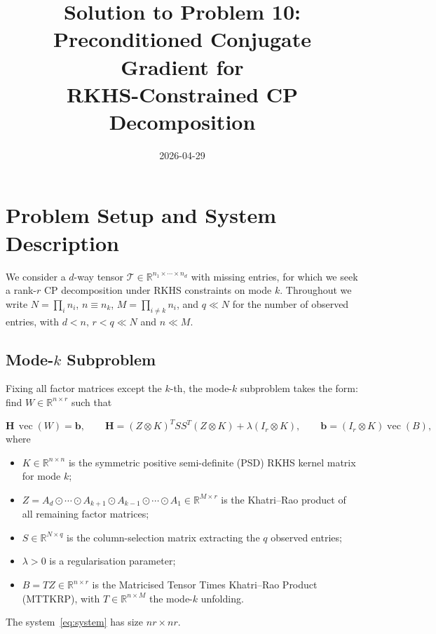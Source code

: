 \documentclass[12pt]{article}
\title{Solution to Problem 10:\\
Preconditioned Conjugate Gradient for\\
RKHS-Constrained CP Decomposition}
\author{}
\date{2026-04-29}
\theoremstyle{definition}
\DeclareMathOperator{\vecop}{vec}
\newcommand{\R}{\mathbb{R}}
\newcommand{\bH}{\mathbf{H}}
\begin{document}
\maketitle

\section{Problem Setup and System Description}

We consider a $d$-way tensor $\mathcal{T}\in\R^{n_1\times\cdots\times n_d}$ with
missing entries, for which we seek a rank-$r$ CP decomposition under RKHS
constraints on mode $k$.  Throughout we write $N=\prod_i n_i$, $n\equiv n_k$,
$M=\prod_{i\neq k}n_i$, and $q\ll N$ for the number of observed entries, with
$d < n,\,r < q\ll N$ and $n\ll M$.

\subsection{Mode-$k$ Subproblem}

Fixing all factor matrices except the $k$-th, the mode-$k$ subproblem takes the
form: find $W\in\R^{n\times r}$ such that

\begin{equation}\label{eq:system}
  \bH\,\vecop(W) = \mathbf{b},
  \qquad
  \bH = (Z\otimes K)^T SS^T (Z\otimes K) + \lambda(I_r\otimes K),
  \qquad
  \mathbf{b} = (I_r\otimes K)\vecop(B),
\end{equation}
where
\begin{itemize}
  \item $K\in\R^{n\times n}$ is the symmetric positive semi-definite (PSD) RKHS
        kernel matrix for mode $k$;
  \item $Z = A_d\odot\cdots\odot A_{k+1}\odot A_{k-1}\odot\cdots\odot A_1
        \in\R^{M\times r}$ is the Khatri--Rao product of all remaining factor
        matrices;
  \item $S\in\R^{N\times q}$ is the column-selection matrix extracting the $q$
        observed entries;
  \item $\lambda>0$ is a regularisation parameter;
  \item $B = TZ\in\R^{n\times r}$ is the Matricised Tensor Times Khatri--Rao
        Product (MTTKRP), with $T\in\R^{n\times M}$ the mode-$k$ unfolding.
\end{itemize}
The system~\eqref{eq:system} has size $nr\times nr$.
\end{document}
